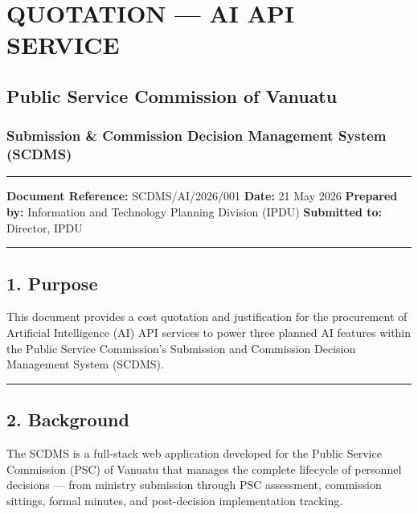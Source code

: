 \documentclass[
]{article}
\author{}
\date{\vspace{-2.5em}}
\begin{document}
\section{QUOTATION --- AI API SERVICE}\label{quotation-ai-api-service}

\subsection{Public Service Commission of
Vanuatu}\label{public-service-commission-of-vanuatu}

\subsubsection{Submission \& Commission Decision Management System
(SCDMS)}\label{submission-commission-decision-management-system-scdms}

\begin{center}\rule{0.5\linewidth}{0.5pt}\end{center}

\textbf{Document Reference:} SCDMS/AI/2026/001 \textbf{Date:} 21 May
2026 \textbf{Prepared by:} Information and Technology Planning Division
(IPDU) \textbf{Submitted to:} Director, IPDU

\begin{center}\rule{0.5\linewidth}{0.5pt}\end{center}

\subsection{1. Purpose}\label{purpose}

This document provides a cost quotation and justification for the
procurement of Artificial Intelligence (AI) API services to power three
planned AI features within the Public Service Commission's Submission
and Commission Decision Management System (SCDMS).

\begin{center}\rule{0.5\linewidth}{0.5pt}\end{center}

\subsection{2. Background}\label{background}

The SCDMS is a full-stack web application developed for the Public
Service Commission (PSC) of Vanuatu that manages the complete lifecycle
of personnel decisions --- from ministry submission through PSC
assessment, commission sittings, formal minutes, and post-decision
implementation tracking.
\end{document}
